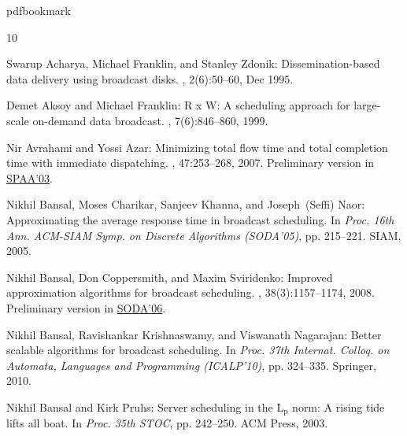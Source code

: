 %
%
%
%
%
\providecommand{\bibhead}[1]{}
%
\expandafter\ifx\csname pdfbookmark\endcsname\relax%
  \providecommand{\tocrefpdfbookmark}{}
\else\providecommand{\tocrefpdfbookmark}{%
   \hypertarget{tocreferences}{}%
   \pdfbookmark[1]{References}{tocreferences}}%
\fi

\tocrefpdfbookmark
\begin{thebibliography}{10}

\bibhead{AcharyaFZ95}
{\sc Swarup Acharya, Michael Franklin, and Stanley Zdonik}: Dissemination-based
  data delivery using broadcast disks.
, 2(6):50--60, Dec 1995.
\newblock [\epfmtdoi{10.1109/98.475988}]

\bibhead{AksoyF98}
{\sc Demet Aksoy and Michael Franklin}: {R x W}: A scheduling approach for
  large-scale on-demand data broadcast.
, 7(6):846--860, 1999.
\newblock [\epfmtdoi{10.1109/90.811450}]

\bibhead{AvrahamiA03}
{\sc Nir Avrahami and Yossi Azar}: Minimizing total flow time and total
  completion time with immediate dispatching.
, 47:253--268, 2007.
\newblock Preliminary version in
  \href{http://dx.doi.org/10.1145/777412.777415}{SPAA'03}.
\newblock [\epfmtdoi{10.1007/s00453-006-0193-6}]

\bibhead{BansalCKN05}
{\sc Nikhil Bansal, Moses Charikar, Sanjeev Khanna, and Joseph~(Seffi) Naor}:
  Approximating the average response time in broadcast scheduling.
\newblock In {\em Proc. 16th Ann. ACM-SIAM Symp. on Discrete Algorithms
  (SODA'05)}, pp. 215--221. SIAM, 2005.

\bibhead{BansalCS08}
{\sc Nikhil Bansal, Don Coppersmith, and Maxim Sviridenko}: Improved
  approximation algorithms for broadcast scheduling.
, 38(3):1157--1174, 2008.
\newblock Preliminary version in
  \href{http://dx.doi.org/10.1145/1109557.1109596}{SODA'06}.
\newblock [\epfmtdoi{10.1137/060674417}]

\bibhead{BansalKN10}
{\sc Nikhil Bansal, Ravishankar Krishnaswamy, and Viswanath Nagarajan}: Better
  scalable algorithms for broadcast scheduling.
\newblock In {\em Proc. 37th Internat. Colloq. on Automata, Languages and
  Programming (ICALP'10)}, pp. 324--335. Springer, 2010.
\newblock [\epfmtdoi{10.1007/978-3-642-14165-2\_28}]

\bibhead{BansalP03}
{\sc Nikhil Bansal and Kirk Pruhs}: Server scheduling in the {L$_{\mbox{p}}$}
  norm: A rising tide lifts all boat.
\newblock In {\em Proc. 35th STOC}, pp. 242--250. ACM Press, 2003.
\newblock [\epfmtdoi{10.1145/780542.780580}]


\end{thebibliography}
